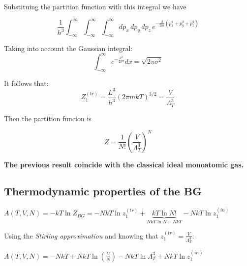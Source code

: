 \documentclass[12pt,a4paper]{report}
\newcommand{\esp}{\vspace{0.5cm}}
\begin{document}
	\esp
	
	\noindent Substituing the partition function with this integral we have
	
	\esp
	
	\begin{equation}
		\frac{1}{h^3} \int_{-\infty}^{\infty} \int_{-\infty}^{\infty} \int_{-\infty}^{\infty} dp_x \, dp_y \, dp_z \, e^{-\frac{\beta}{2m}(p_x^2 + p_y^2 + p_z^2)}
	\end{equation}
	
	\esp
	
	\noindent Taking into account the Gaussian integral:
	\begin{equation}
		\int_{-\infty}^{\infty} e^{-\frac{x^2}{2\sigma^2}} dx = \sqrt{2\pi\sigma^2}
	\end{equation}
	
	\esp
	
	\noindent It follows that:
	\begin{equation}
		Z_1^{(tr)} = \frac{L^3}{h^3} (2\pi mkT)^{3/2} = \frac{V}{\Lambda_T^3}
	\end{equation}
	
	\esp
	
	\noindent Then the partition funcion is
	
	\esp
	
	\begin{equation}
		Z = \frac{1}{N!}\left(\frac{V}{\Lambda_T^3}\right)^N
	\end{equation}
	
	\esp
	
	\noindent \textbf{The previous result coincide with the classical ideal monoatomic gas.}
	
	\subsection{Thermodynamic properties of the BG}
	
	\esp
	
	$A(T, V, N) = -kT \ln Z_{BG} = -NkT \ln z_1^{(tr)} + \underbrace{kT \ln N!}_{NkT \ln N - NkT} - NkT \ln z_1^{(in)}$
	
	\esp
	
	Using the \textit{Stirling approximation} and knowing that $z_1^{(tr)} = \frac{V}{\Lambda_T^3}$:
	
	\esp
	
	$A(T, V, N) = -NkT + NkT \ln \left( \frac{V}{N} \right) - NkT \ln \Lambda_T^3 + NkT \ln z_1^{(in)}$
	
	\esp
	
\end{document}
